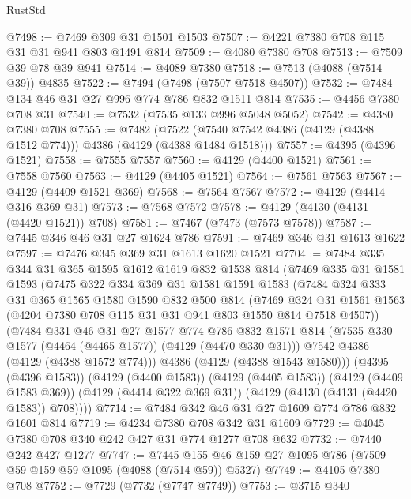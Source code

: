 \begin{lexlean}{RustStd}
\begin{coremodule}
@7498 := @7469 @309 @31 @1501 @1503
@7507 := @4221 @7380 @708 @115 @31 @31 @941 @803 @1491 @814
@7509 := @4080 @7380 @708
@7513 := @7509 @39 @78 @39 @941
@7514 := @4089 @7380
@7518 := @7513 (@4088 (@7514 @39)) @4835
@7522 := @7494 (@7498 (@7507 @7518 @4507))
@7532 := @7484 @134 @46 @31 @27 @996 @774 @786 @832 @1511 @814
@7535 := @4456 @7380 @708 @31
@7540 := @7532 (@7535 @133 @996 @5048 @5052)
@7542 := @4380 @7380 @708
@7555 := @7482
    (@7522 (@7540 @7542 @4386 (@4129 (@4388 @1512 @774))) @4386 (@4129 (@4388 @1484 @1518)))
@7557 := @4395 (@4396 @1521)
@7558 := @7555 @7557
@7560 := @4129 (@4400 @1521)
@7561 := @7558 @7560
@7563 := @4129 (@4405 @1521)
@7564 := @7561 @7563
@7567 := @4129 (@4409 @1521 @369)
@7568 := @7564 @7567
@7572 := @4129 (@4414 @316 @369 @31)
@7573 := @7568 @7572
@7578 := @4129 (@4130 (@4131 (@4420 @1521)) @708)
@7581 := @7467 (@7473 (@7573 @7578))
@7587 := @7445 @346 @46 @31 @27 @1624 @786
@7591 := @7469 @346 @31 @1613 @1622
@7597 := @7476 @345 @369 @31 @1613 @1620 @1521
@7704 := @7484
    @335
    @344
    @31
    @365
    @1595
    @1612
    @1619
    @832
    @1538
    @814
    (@7469
      @335
      @31
      @1581
      @1593
      (@7475
        @322
        @334
        @369
        @31
        @1581
        @1591
        @1583
        (@7484
          @324
          @333
          @31
          @365
          @1565
          @1580
          @1590
          @832
          @500
          @814
          (@7469
            @324
            @31
            @1561
            @1563
            (@4204 @7380 @708 @115 @31 @31 @941 @803 @1550 @814 @7518 @4507))
          (@7484
            @331
            @46
            @31
            @27
            @1577
            @774
            @786
            @832
            @1571
            @814
            (@7535 @330 @1577 (@4464 (@4465 @1577)) (@4129 (@4470 @330 @31)))
            @7542
            @4386
            (@4129 (@4388 @1572 @774)))
          @4386
          (@4129 (@4388 @1543 @1580)))
        (@4395 (@4396 @1583))
        (@4129 (@4400 @1583))
        (@4129 (@4405 @1583))
        (@4129 (@4409 @1583 @369))
        (@4129 (@4414 @322 @369 @31))
        (@4129 (@4130 (@4131 (@4420 @1583)) @708))))
@7714 := @7484 @342 @46 @31 @27 @1609 @774 @786 @832 @1601 @814
@7719 := @4234 @7380 @708 @342 @31 @1609
@7729 := @4045 @7380 @708 @340 @242 @427 @31 @774 @1277 @708 @632
@7732 := @7440 @242 @427 @1277
@7747 := @7445 @155 @46 @159 @27 @1095 @786 (@7509 @59 @159 @59 @1095 (@4088 (@7514 @59)) @5327)
@7749 := @4105 @7380 @708
@7752 := @7729 (@7732 (@7747 @7749))
@7753 := @3715 @340

\end{coremodule}
\end{lexlean}
